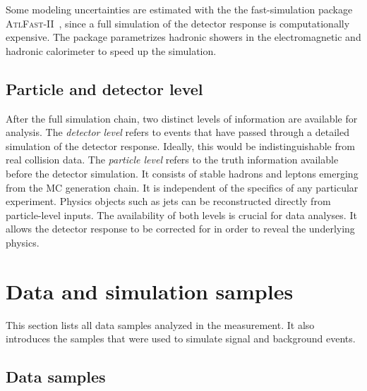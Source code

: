 Some modeling uncertainties are estimated with the the fast-simulation package
\textsc{AtlFast-II}~\cite{SOFT-2010-01}, since a
full simulation of the detector response is computationally expensive.
The package parametrizes hadronic
showers in the electromagnetic and hadronic calorimeter to speed up the simulation.

\subsection{Particle and detector level}

After the full simulation chain, two distinct levels of information are available for analysis. The \textit{detector level} refers to events that have passed through a detailed simulation of the detector response. Ideally, this would be indistinguishable from real collision data. The \textit{particle level} refers to the truth information available before the detector simulation.
It consists of stable hadrons and leptons emerging from the MC generation chain. It is independent of the specifics of any particular experiment.
Physics objects such as jets can be reconstructed directly from particle-level inputs.
The availability of both levels is crucial for data analyses. It allows the detector response to be corrected for in order to reveal the underlying physics.

\section{Data and simulation samples}

This section lists all data samples analyzed in the measurement.
It also introduces the samples that were used to simulate signal and background events.

\subsection{Data samples}

